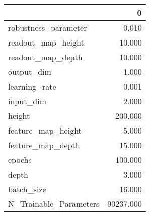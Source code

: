 \begin{tabular}{lr}
\toprule
{} &          0 \\
\midrule
robustness\_parameter   &      0.010 \\
readout\_map\_height     &     10.000 \\
readout\_map\_depth      &     10.000 \\
output\_dim             &      1.000 \\
learning\_rate          &      0.001 \\
input\_dim              &      2.000 \\
height                 &    200.000 \\
feature\_map\_height     &      5.000 \\
feature\_map\_depth      &     15.000 \\
epochs                 &    100.000 \\
depth                  &      3.000 \\
batch\_size             &     16.000 \\
N\_Trainable\_Parameters &  90237.000 \\
\bottomrule
\end{tabular}
